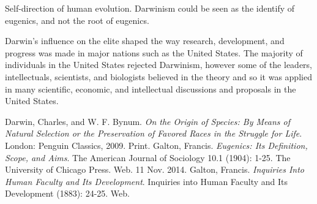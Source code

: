 \documentclass[11pt, oneside]{article}
\begin{document}
\par Self-direction of human evolution. Darwinism could be seen as the identify of eugenics, and not the root of eugenics.


\par Darwin's influence on the elite shaped the way research, development, and progress was made in major nations such as the United States. The majority of individuals in the United States rejected Darwinism, however some of the leaders, intellectuals, scientists, and biologists believed in the theory and so it was applied in many scientific, economic, and intellectual discussions and proposals in the United States. 

\par

\begin{thebibliography}{9}
  Darwin, Charles, and W. F. Bynum.
  \emph{On the Origin of Species: By Means of Natural Selection or the Preservation of Favored Races in the Struggle for Life}.
  London: Penguin Classics, 2009.
  Print.
  Galton, Francis.
  \emph{Eugenics: Its Definition, Scope, and Aims}.
  The American Journal of Sociology 10.1 (1904): 1-25.
  The University of Chicago Press. Web. 11 Nov. 2014.
  Galton, Francis.
  \emph{Inquiries Into Human Faculty and Its Development}.
  Inquiries into Human Faculty and Its Development (1883): 24-25. 
  Web.
\end{thebibliography}
\end{document}
